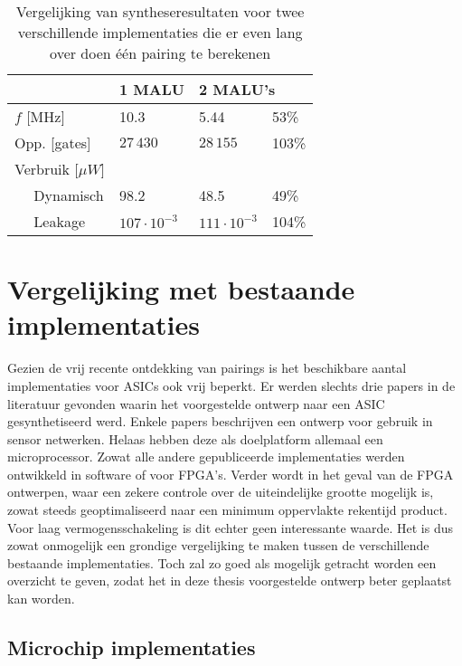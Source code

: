\begin{table}[h]
	\caption{Vergelijking van syntheseresultaten voor twee verschillende implementaties die er even lang over doen \'e\'en pairing te berekenen}
	\label{tabel-resultaten-m1-vs-m2}

	\centering
	\begin{tabular}{lll@{$\;\;$}l}
		\toprule
		& 1 MALU	& \multicolumn{2}{l}{2 MALU's}\\
		\midrule
		$f$ [MHz]					& 10.3						& 5.44						& 53\% \\ 
		Opp. [gates]				& $27\,430$					& $28\,155$					& 103\% \\
		Verbruik [$\mu W$]		& 								& 								& \\
		$\quad$ Dynamisch			& 98.2						& 48.5						& 49\% \\
		$\quad$ Leakage			& $107 \cdot 10^{-3}$	& $111 \cdot 10^{-3}$	& 104\% \\
		\bottomrule	
	\end{tabular}
\end{table}

\section{Vergelijking met bestaande implementaties}

Gezien de vrij recente ontdekking van pairings is het beschikbare aantal implementaties voor ASICs ook vrij beperkt. Er werden slechts drie papers in de literatuur gevonden waarin het voorgestelde ontwerp naar een ASIC gesynthetiseerd werd. Enkele papers beschrijven een ontwerp voor gebruik in sensor netwerken. Helaas hebben deze als doelplatform allemaal een microprocessor. Zowat alle andere gepubliceerde implementaties werden ontwikkeld in software of voor FPGA's. Verder wordt in het geval van de FPGA ontwerpen, waar een zekere controle over de uiteindelijke grootte mogelijk is, zowat steeds geoptimaliseerd naar een minimum oppervlakte rekentijd product. Voor laag vermogensschakeling is dit echter geen interessante waarde. Het is dus zowat onmogelijk een grondige vergelijking te maken tussen de verschillende bestaande implementaties. Toch zal zo goed als mogelijk getracht worden een overzicht te geven, zodat het in deze thesis voorgestelde ontwerp beter geplaatst kan worden.

\subsection{Microchip implementaties}

